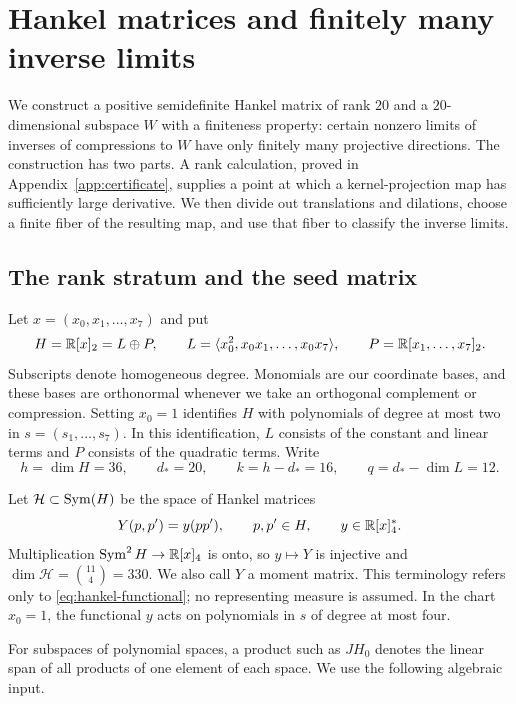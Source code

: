 \section{Hankel matrices and finitely many inverse limits}
\label{sec:hankel}

We construct a positive semidefinite Hankel matrix of rank $20$ and a
$20$-dimensional subspace $W$ with a finiteness property: certain nonzero
limits of inverses of compressions to $W$ have only finitely many
projective directions. The construction has two parts. A rank calculation,
proved in Appendix~\ref{app:certificate}, supplies a point at which a
kernel-projection map has sufficiently large derivative. We then divide
out translations and dilations, choose a finite fiber of the resulting
map, and use that fiber to classify the inverse limits.

\subsection{The rank stratum and the seed matrix}

Let $x=(x_0,x_1,\ldots,x_7)$ and put
\[
 H=\mathbb R[x]_2=L\oplus P,
 \qquad
 L=\langle x_0^2,x_0x_1,\ldots,x_0x_7\rangle,
 \qquad
 P=\mathbb R[x_1,\ldots,x_7]_2.
\]
Subscripts denote homogeneous degree. Monomials are our coordinate bases,
and these bases are orthonormal whenever we take an orthogonal complement
or compression. Setting $x_0=1$ identifies $H$ with polynomials of degree
at most two in $s=(s_1,\ldots,s_7)$. In this identification, $L$ consists
of the constant and linear terms and $P$ consists of the quadratic terms.
Write
\begin{equation}
\label{eq:hankel-dimensions}
 h=\dim H=36,\qquad d_*=20,\qquad k=h-d_*=16,
 \qquad q=d_*-\dim L=12.
\end{equation}

Let $\mathcal H\subset\operatorname{Sym}(H)$ be the space of Hankel matrices
\begin{equation}
\label{eq:hankel-functional}
 Y(p,p')=y(pp'),\qquad p,p'\in H,
 \qquad y\in\mathbb R[x]_4^*.
\end{equation}
Multiplication $\operatorname{Sym}^2H\to\mathbb R[x]_4$ is onto, so $y\mapsto Y$ is
injective and $\dim\mathcal H=\binom{11}{4}=330$.
We also call $Y$ a moment matrix. This terminology refers only to
\eqref{eq:hankel-functional}; no representing measure is assumed.
In the chart $x_0=1$, the functional $y$ acts on polynomials in $s$ of
degree at most four.

For subspaces of polynomial spaces, a product such as $JH_0$ denotes
the linear span of all products of one element of each space. We use
the following algebraic input.

